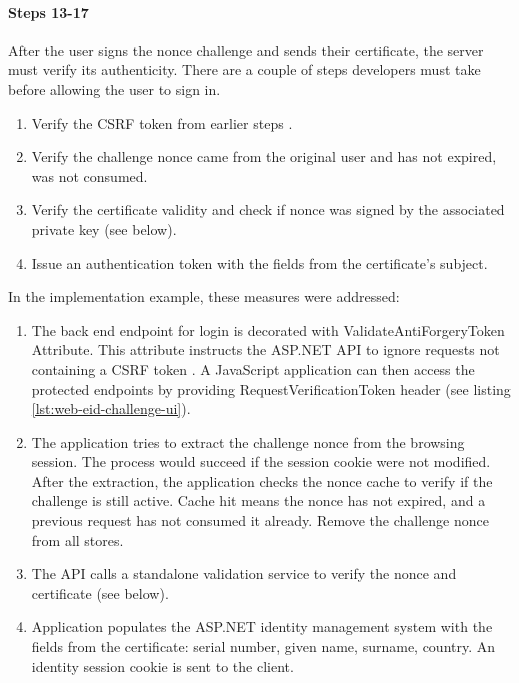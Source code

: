 \paragraph{Steps 13-17}

After the user signs the nonce challenge and sends their certificate, the server must verify its authenticity. There are a couple of steps developers must take before allowing the user to sign in.

\begin{enumerate}
  \item Verify the CSRF token from earlier steps \cite{ria-webeid-source-web-eid-authtoken-validation-java-readme}.
  \item Verify the challenge nonce came from the original user and has not expired, was not consumed.
  \item Verify the certificate validity and check if nonce was signed by the associated private key (see below).
  \item Issue an authentication token with the fields from the certificate's subject.
\end{enumerate}

In the implementation example, these measures were addressed:
\begin{enumerate}
  \item The back end endpoint for login is decorated with ValidateAntiForgeryToken Attribute. This attribute instructs the ASP.NET API to ignore requests not containing a CSRF token \cite{msdocs-anti-request-forgery}. A JavaScript application can then access the protected endpoints by providing RequestVerificationToken header (see listing \ref{lst:web-eid-challenge-ui}).
  \item The application tries to extract the challenge nonce from the browsing session. The process would succeed if the session cookie were not modified. After the extraction, the application checks the nonce cache to verify if the challenge is still active. Cache hit means the nonce has not expired, and a previous request has not consumed it already. Remove the challenge nonce from all stores.
  \item The API calls a standalone validation service to verify the nonce and certificate (see below).
  \item Application populates the ASP.NET identity management system with the fields from the certificate: serial number, given name, surname, country. An identity session cookie is sent to the client.
\end{enumerate}

